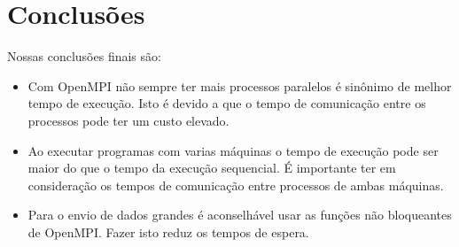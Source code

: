 \section{Conclusões}
Nossas conclusões finais são:
\begin{itemize}
	\item Com OpenMPI não sempre ter mais processos paralelos é sinônimo de melhor tempo de execução. Isto é devido a que o tempo de comunicação entre os processos pode ter um custo elevado.
	\item Ao executar programas com varias máquinas o tempo de execução pode ser maior do que o tempo da execução sequencial. É importante ter em consideração os tempos de comunicação entre processos de ambas máquinas.
	\item Para o envio de dados grandes é aconselhável usar as funções não bloqueantes de OpenMPI. Fazer isto reduz os tempos de espera.
\end{itemize}

\clearpage